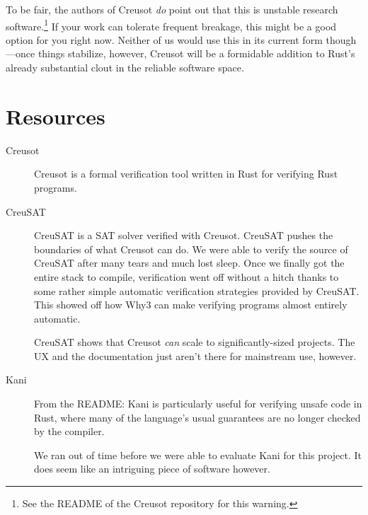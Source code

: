\documentclass[12pt]{article}
\begin{document}
To be fair, the authors of Creusot \emph{do} point out that this is unstable research software.\footnote{See the README of the Creusot\cite{denisCreusot2023} repository for this warning.}
If your work can tolerate frequent breakage, this might be a good option for you right now.
Neither of us would use this in its current form though---once things stabilize, however, Creusot will be a formidable addition to Rust's already substantial clout in the reliable software space.

\section{Resources}

\begin{description}
  \item[Creusot] \cite{denisCreusot2023} \cite{denisCreusotFoundryDeductive2022}

    Creusot is a formal verification tool written in Rust for verifying Rust programs.

  \item[CreuSAT] \cite{skotamCreuSAT2023}

    CreuSAT is a SAT solver verified with Creusot.
    CreuSAT pushes the boundaries of what Creusot can do.
    We were able to verify the source of CreuSAT after many tears and much lost sleep.
    Once we finally got the entire stack to compile, verification went off without a hitch thanks to some rather simple automatic verification strategies provided by CreuSAT.
    This showed off how Why3 can make verifying programs almost entirely automatic.

    CreuSAT shows that Creusot \emph{can} scale to significantly-sized projects.
    The UX and the documentation just aren't there for mainstream use, however.
    
  \item[Kani] \cite{Kani2023}

    From the README: Kani is particularly useful for verifying unsafe code in
    Rust, where many of the language's usual guarantees are no longer checked by
    the compiler.

    We ran out of time before we were able to evaluate Kani for this project.
    It does seem like an intriguing piece of software however.

\end{description}

\printbibliography
\end{document}
